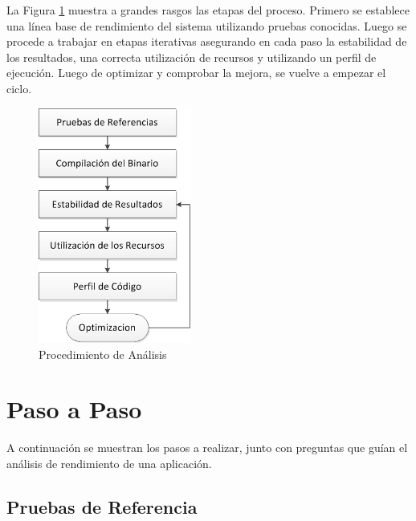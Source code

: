 \documentclass[a4paper]{report}
\begin{document}
La Figura \ref{fig:procedure} muestra a grandes rasgos las etapas del proceso.
Primero se establece una línea base de rendimiento del sistema utilizando pruebas conocidas.
Luego se procede a trabajar en etapas iterativas asegurando en cada paso la estabilidad de los resultados, una correcta utilización de recursos y utilizando un perfil de ejecución. Luego de optimizar y comprobar la mejora, se vuelve a empezar el ciclo.

\begin{figure}[H]
\label{fig:procedure}
\centering
\includegraphics[width=5cm]{procedure.png}
\caption{Procedimiento de Análisis}
\end{figure}

\section{Paso a Paso}

A continuación se muestran los pasos a realizar, junto con preguntas que guían el análisis de rendimiento de una aplicación.

\subsection{Pruebas de Referencia}
\end{document}
